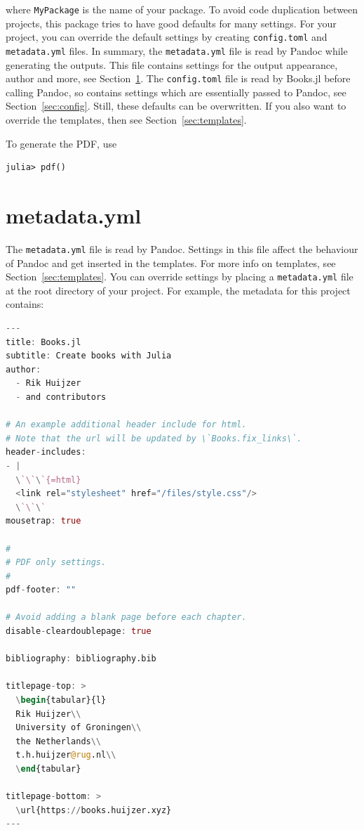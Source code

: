 \documentclass[
  notoc %
]{tufte-book}
\newcommand{\passthrough}[1]{#1}
\begin{document}
where \passthrough{\lstinline!MyPackage!} is the name of your package.
To avoid code duplication between projects, this package tries to have
good defaults for many settings. For your project, you can override the
default settings by creating \passthrough{\lstinline!config.toml!} and
\passthrough{\lstinline!metadata.yml!} files. In summary, the
\passthrough{\lstinline!metadata.yml!} file is read by Pandoc while
generating the outputs. This file contains settings for the output
appearance, author and more, see Section~\ref{sec:metadata}. The
\passthrough{\lstinline!config.toml!} file is read by Books.jl before
calling Pandoc, so contains settings which are essentially passed to
Pandoc, see Section~\ref{sec:config}. Still, these defaults can be
overwritten. If you also want to override the templates, then see
Section~\ref{sec:templates}.

To generate the PDF, use

\begin{lstlisting}
julia> pdf()
\end{lstlisting}

\hypertarget{sec:metadata}{%
\section{metadata.yml}\label{sec:metadata}}

The \passthrough{\lstinline!metadata.yml!} file is read by Pandoc.
Settings in this file affect the behaviour of Pandoc and get inserted in
the templates. For more info on templates, see
Section~\ref{sec:templates}. You can override settings by placing a
\passthrough{\lstinline!metadata.yml!} file at the root directory of
your project. For example, the metadata for this project contains:

\begin{lstlisting}[language=Julia]
---
title: Books.jl
subtitle: Create books with Julia
author:
  - Rik Huijzer
  - and contributors

# An example additional header include for html.
# Note that the url will be updated by \`Books.fix_links\`.
header-includes:
- |
  \`\`\`{=html}
  <link rel="stylesheet" href="/files/style.css"/>
  \`\`\`
mousetrap: true

#
# PDF only settings.
#
pdf-footer: ""

# Avoid adding a blank page before each chapter.
disable-cleardoublepage: true

bibliography: bibliography.bib

titlepage-top: >
  \begin{tabular}{l}
  Rik Huijzer\\
  University of Groningen\\
  the Netherlands\\
  t.h.huijzer@rug.nl\\
  \end{tabular}

titlepage-bottom: >
  \url{https://books.huijzer.xyz}
---

\end{lstlisting}
\end{document}
